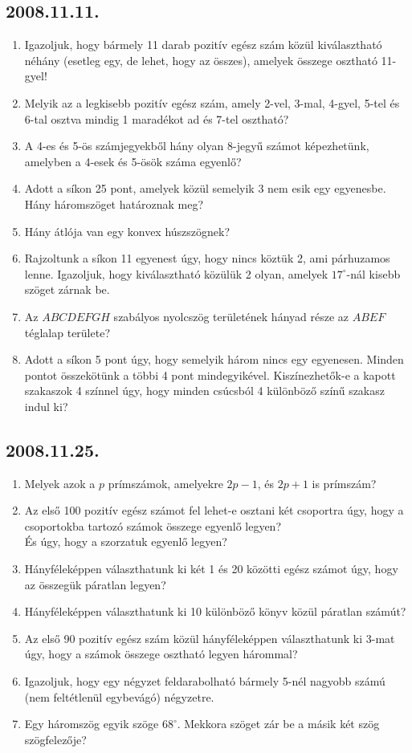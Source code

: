 \documentclass{article}
\begin{document}
\subsection*{2008.11.11.}
\begin{enumerate}
\item Igazoljuk, hogy bármely 11 darab pozitív egész szám közül kiválasztható néhány (esetleg egy, de lehet, hogy az összes), amelyek összege osztható 11-gyel! 
\item Melyik az a legkisebb pozitív egész szám, amely 2-vel, 3-mal, 4-gyel, 5-tel és 6-tal osztva mindig 1 maradékot ad és 7-tel osztható?
\item A 4-es és 5-ös számjegyekből hány olyan 8-jegyű számot képezhetünk, amelyben a 4-esek és 5-ösök száma egyenlő?
\item Adott a síkon 25 pont, amelyek közül semelyik 3 nem esik egy egyenesbe. Hány háromszöget határoznak meg?
\item Hány átlója van egy konvex húszszögnek? 
\item Rajzoltunk a síkon 11 egyenest úgy, hogy nincs köztük 2, ami párhuzamos lenne. Igazoljuk, hogy kiválaszt\-ha\-tó közülük 2 olyan, amelyek $17^\circ$-nál kisebb szöget zárnak be.
\item Az $ABCDEFGH$ szabályos nyolcszög területének hányad része az $ABEF$ téglalap területe?
\item Adott a síkon 5 pont úgy, hogy semelyik három nincs egy egyenesen. Minden pontot összekötünk a többi 4 pont mindegyikével. Kiszínezhetők-e a kapott szakaszok 4 színnel úgy, hogy minden csúcsból 4 különböző színű szakasz indul ki?
\end{enumerate}

\subsection*{2008.11.25.}
\begin{enumerate}
\item Melyek azok a $p$ prímszámok, amelyekre $2p-1$, és $2p+1$ is prímszám?
\item Az első 100 pozitív egész számot fel lehet-e osztani két csoportra úgy, hogy a csoportokba tartozó számok összege egyenlő legyen?\\
És úgy, hogy a szorzatuk egyenlő legyen?
\item Hányféleképpen választhatunk ki két 1 és 20 közötti egész számot úgy, hogy az összegük páratlan legyen?
\item Hányféleképpen választhatunk ki 10 különböző könyv közül páratlan számút?
\item Az első 90 pozitív egész szám közül hányféleképpen választhatunk ki 3-mat úgy, hogy a számok összege osztható legyen hárommal?
\item Igazoljuk, hogy egy négyzet feldarabolható bármely 5-nél nagyobb számú (nem feltétlenül egybevágó) négyzetre.
\item Egy háromszög egyik szöge $68^\circ$. Mekkora szöget zár be a másik két szög szögfelezője?
\end{enumerate}
\end{document}
